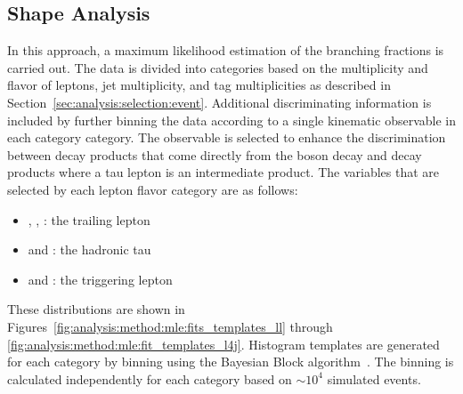 
\subsection{Shape Analysis}
\label{sec:analysis:method:mle}

In this approach, a maximum likelihood estimation of the branching fractions is carried out.  The data is divided into categories based on the multiplicity and flavor of leptons, jet multiplicity, and \PQb tag multiplicities as described in Section~\ref{sec:analysis:selection:event}.  Additional discriminating information is included by further binning the data according to a single kinematic observable in each category category. The observable is selected to enhance the discrimination between decay products that come directly from the \PW boson decay and decay products where a tau lepton is an intermediate product.  The variables that are selected by each lepton flavor category are as follows:
\begin{itemize}
    \item \cee, \cmm, \cem: the trailing lepton \pt
    \item \cet and \cmt: the hadronic tau \pt
    \item \ceh and \cmh: the triggering lepton \pt
\end{itemize}
\noindent These distributions are shown in Figures~\ref{fig:analysis:method:mle:fits_templates_ll} through \ref{fig:analysis:method:mle:fit_templates_l4j}. Histogram templates are generated for each category by binning using the Bayesian Block algorithm~\cite{Pollack:2017srh}.  The binning is calculated independently for each category based on $\sim 10^{4}$ simulated events.
